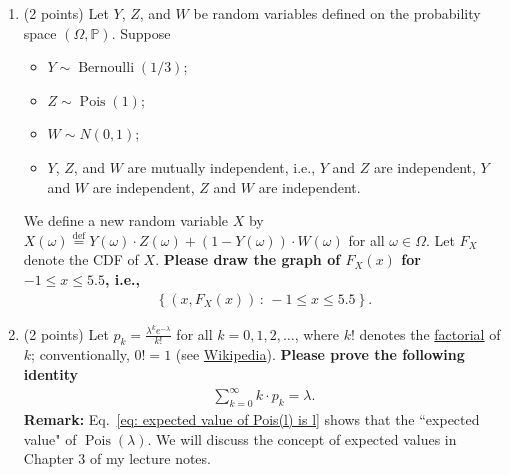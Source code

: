 \documentclass[11pt]{article}
\newcommand{\1}{\mathbbm{1}}
\begin{document}
\begin{enumerate}
\item (2 points) Let $Y$, $Z$, and $W$ be random variables defined on the probability space $(\Omega,\mathbb{P})$. Suppose
    \begin{itemize}
        \item $Y\sim\operatorname{Bernoulli}(1/3)$;
        \item $Z\sim \operatorname{Pois}(1)$;
        \item $W\sim N(0,1)$;
        \item $Y$, $Z$, and $W$ are mutually independent, i.e., $Y$ and $Z$ are independent, $Y$ and $W$ are independent, $Z$ and $W$ are independent.
    \end{itemize} 
    We define a new random variable $X$ by $X(\omega)\overset{\operatorname{def}}{=} Y(\omega)\cdot Z(\omega) + (1-Y(\omega))\cdot W(\omega)$ for all $\omega\in\Omega$. Let $F_X$ denote the CDF of $X$. \textbf{Please draw the graph of $F_X(x)$ for $-1\le x\le 5.5$, i.e., }
    \begin{align*}
        \left\{\left(x, F_X(x)\right) \,:\, -1\le x\le 5.5\right\}.
    \end{align*}


    \item (2 points) Let $p_{k}=\frac{\lambda^{k} e^{-\lambda}}{k!}$ for all $k=0,1,2,\ldots$, where $k!$ denotes the \href{https://en.wikipedia.org/wiki/Factorial}{factorial} of $k$; conventionally, $0!=1$ (see \href{https://en.wikipedia.org/wiki/Factorial}{Wikipedia}). \textbf{Please prove the following identity}
    \begin{align}\label{eq: expected value of Pois(l) is l}
        \sum_{k=0}^\infty k\cdot p_k=\lambda.
    \end{align}
    \textbf{Remark:} Eq.~\eqref{eq: expected value of Pois(l) is l} shows that the ``expected value" of $\operatorname{Pois}(\lambda)$. We will discuss the concept of expected values in Chapter 3 of my lecture notes.

\end{enumerate}


\newpage
\end{document}
